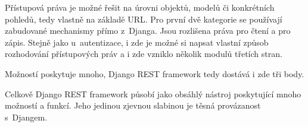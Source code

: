Přístupová práva je možné řešit na úrovni objektů, modelů či konkrétních pohledů, tedy vlastně na základě URL. Pro první dvě kategorie se používají zabudované mechanismy přímo z~Djanga. Jsou rozlišena práva pro čtení a pro zápis. Stejně jako u~autentizace, i zde je možné si napsat vlastní způsob rozhodování přístupových práv a i zde vzniklo několik modulů třetích stran.

Možností poskytuje mnoho, Django REST framework tedy dostává i zde tři body.

Celkově Django REST framework působí jako obsáhlý nástroj poskytující mnoho možností a funkcí. Jeho jedinou zjevnou slabinou je těsná provázanost s~Djangem.
